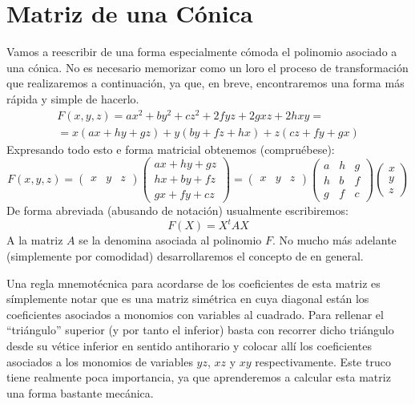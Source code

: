 \section{Matriz de una Cónica}
Vamos a reescribir de una forma especialmente cómoda el polinomio asociado a una cónica. No es necesario memorizar como un loro el proceso de transformación que realizaremos a continuación, ya que, en breve, encontraremos una forma más rápida y simple de hacerlo.
\begin{multline}
	F(x,y,z)=ax^2+by^2+cz^2+2fyz+2gxz+2hxy=\\
	=x(ax+hy+gz)+y(by+fz+hx)+z(cz+fy+gx)
\end{multline}
Expresando todo esto e forma matricial obtenemos (compruébese):
\[F(x,y,z)=\begin{pmatrix}
x & y & z
\end{pmatrix}\begin{pmatrix}
ax+hy+gz\\
hx+by+fz\\
gx+fy+cz
\end{pmatrix}=\begin{pmatrix}
x & y & z
\end{pmatrix}\begin{pmatrix}
a & h & g\\
h & b & f\\
g & f & c
\end{pmatrix}\begin{pmatrix}
x\\
y\\
z
\end{pmatrix}\]
De forma abreviada (abusando de notación) usualmente escribiremos:
\[F(X)=X^tAX\]
A la matriz $A$ se la denomina  asociada al polinomio $F$. No mucho más adelante (simplemente por comodidad) desarrollaremos el concepto de  en general.

\begin{obs}
	Una regla mnemotécnica para acordarse de los coeficientes de esta matriz es símplemente notar que es una matriz simétrica en cuya diagonal están los coeficientes asociados a monomios con variables al cuadrado. Para rellenar el ``triángulo'' superior (y por tanto el inferior) basta con recorrer dicho triángulo desde su vétice inferior en sentido antihorario y colocar allí los coeficientes asociados a los monomios de variables $yz$, $xz$ y $xy$ respectivamente. Este truco tiene realmente poca importancia, ya que aprenderemos a calcular esta matriz una forma bastante mecánica.
\end{obs}

